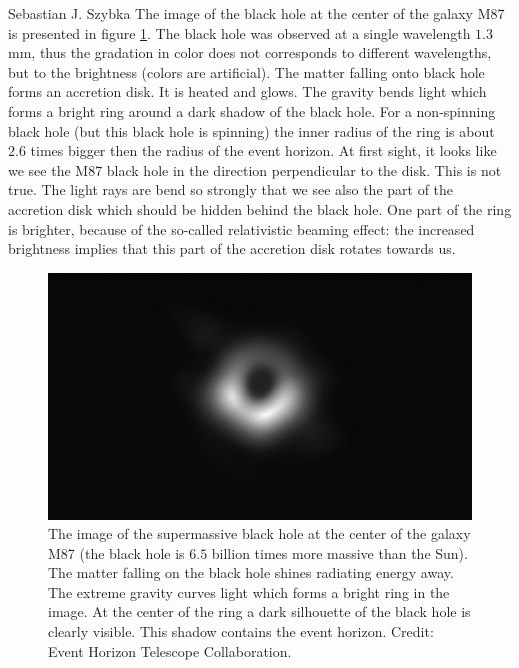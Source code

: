 \begin{artengenv}{Sebastian J. Szybka}
The image of the black hole at the center of the galaxy M87 is presented in figure \ref{bh}. The black hole was observed at a single wavelength $1.3$ mm, thus the gradation in color does not corresponds to different wavelengths, but to the brightness (colors are artificial). The matter falling onto black hole forms an accretion disk. It is heated and glows. The gravity bends light which forms a bright ring around a dark shadow of the black hole. For a non-spinning black hole (but this black hole is spinning) the inner radius of the ring is about $2.6$ times bigger then the radius of the event horizon. At first sight, it looks like we see the M87 black hole in the direction perpendicular to the disk. This is not true. The light rays are bend so strongly that we see also the part of the accretion disk which should be hidden behind the black hole. One part of the ring is brighter, because of the so-called relativistic beaming effect: the increased brightness implies that this part of the accretion disk rotates towards us.
%
\begin{figure}[t!]
\begin{center}
\includegraphics[width=\textwidth]{ART_Szybka/szybka-imgbw.png}
\caption{The image of the supermassive black hole at the center of the galaxy M87 (the black hole is $6.5$ billion times more massive than the Sun). The matter falling on the black hole shines radiating energy away. The extreme gravity curves light which forms a bright ring in the image. At the center of the ring a dark silhouette of the black hole is clearly visible. This shadow contains the event horizon. Credit: Event Horizon Telescope Collaboration.}
\label{bh}
\end{center}
\end{figure}
%


\end{artengenv}
